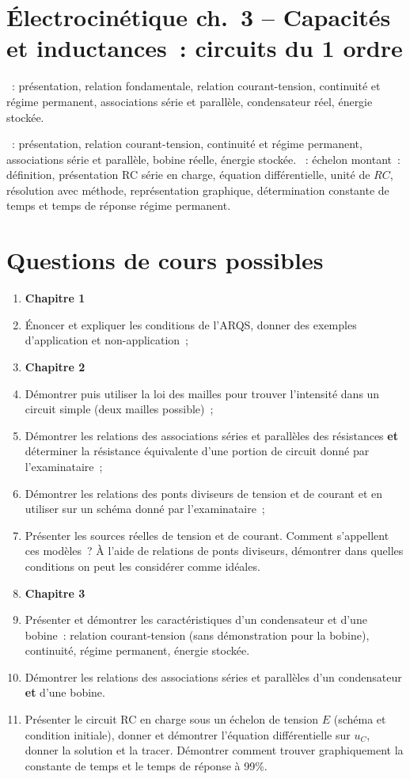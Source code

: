 \documentclass[a4paper, 12pt, final, garamond]{book}
\begin{document}
\section*{Électrocinétique ch.\ 3 -- Capacités et inductances~: circuits du
  1\ier{} ordre}
\begin{enumerate}[label=\Roman*]
	~: présentation, relation fondamentale,
	relation courant-tension, continuité et régime permanent, associations
	série et parallèle, condensateur réel, énergie stockée.

	~: présentation, relation courant-tension, continuité
	et régime permanent, associations série et parallèle, bobine réelle, énergie
	stockée.
	~: échelon montant~: définition, présentation RC
	série en charge, équation différentielle, unité de $RC$, résolution avec
	méthode, représentation graphique, détermination constante de temps et temps
	de réponse régime permanent.
\end{enumerate}

\newpage
\section{Questions de cours possibles}
\begin{enumerate}
	\item[] \textbf{Chapitre 1}
	\item Énoncer et expliquer les conditions de l'ARQS, donner des exemples
	      d'application et non-application~;
	\item[] \textbf{Chapitre 2}
	\item Démontrer puis utiliser la loi des mailles pour trouver l'intensité
	      dans un circuit simple (deux mailles possible)~;
	\item Démontrer les relations des associations séries et parallèles des
	      résistances \textbf{et} déterminer la résistance équivalente d'une
	      portion de circuit donné par l'examinataire~;
	\item Démontrer les relations des ponts diviseurs de tension et de courant
	      et en utiliser sur un schéma donné par l'examinataire~;
	\item Présenter les sources réelles de tension et de courant. Comment
	      s'appellent ces modèles~? À l'aide de relations de ponts diviseurs,
	      démontrer dans quelles conditions on peut les considérer comme idéales.
	\item[] \textbf{Chapitre 3}
	\item Présenter et démontrer les caractéristiques d'un condensateur et d'une
	      bobine~: relation courant-tension (sans démonstration pour la bobine),
	      continuité, régime permanent, énergie stockée.
	\item Démontrer les relations des associations séries et parallèles
	      d'un condensateur \textbf{et} d'une bobine.
	\item Présenter le circuit RC en charge sous un échelon de tension $E$
	      (schéma et condition initiale), donner et démontrer l'équation
	      différentielle sur $u_C$, donner la solution et la tracer. Démontrer
	      comment trouver graphiquement la constante de temps et le temps de
	      réponse à 99\%.
\end{enumerate}
\end{document}
